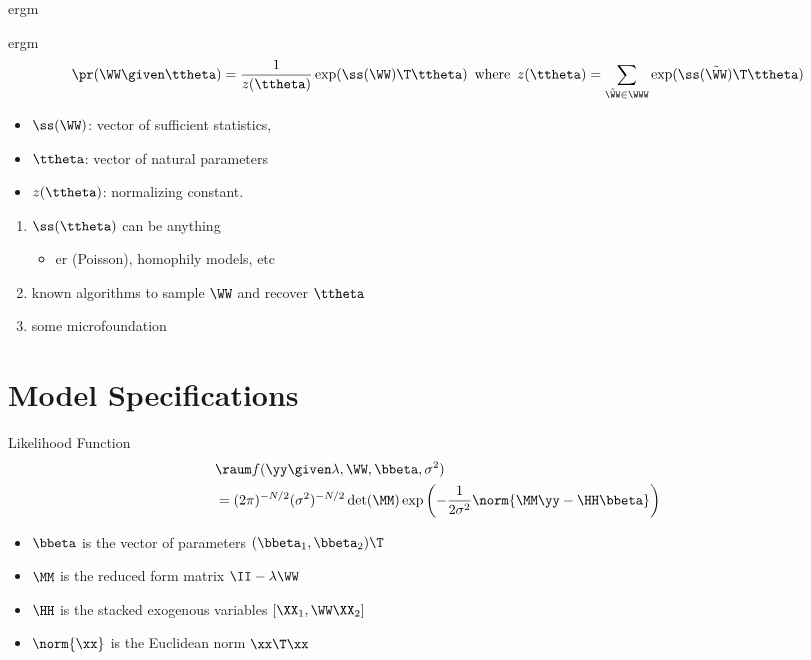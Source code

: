 \documentclass{beamer}
\begin{document}
\begin{frame}{\acrlong{ergm}}
	\begin{block}{\acrshort{ergm}}
		\vspace{-1em}
		\begin{align*}
			\pr(\WW\given\ttheta) = \frac1{z(\ttheta)} \exp(\ss(\WW)\T\ttheta)
			\hspace{0.5em}\text{where}\hspace{0.5em}
			z(\ttheta) = \sum_{\tilde\WW\in\WWW} \exp(\ss(\tilde\WW)\T\ttheta)
		\end{align*}
	\end{block}
	\begin{itemize}
		\item $\ss(\WW)$: vector of sufficient statistics,
		\item $\ttheta$: vector of natural parameters
		\item $z(\ttheta)$: normalizing constant.
	\end{itemize}
	\vspace{1em}
	\begin{enumerate}
		\item {} $\ss(\ttheta)$ can be anything
			\begin{itemize}
				\item \acrlong{er} (Poisson), homophily models, etc
			\end{itemize}
		\item {} known algorithms to sample $\WW$ and recover $\ttheta$
		\item {} some microfoundation
	\end{enumerate}
\end{frame}

\section{Model Specifications}

\begin{frame}{Likelihood Function}
	\begin{align*}
		&\raum f(\yy\given\lambda,\WW,\bbeta,\sigma^2) \\
		&=
		(2\pi)^{-N/2}
		(\sigma^2)^{-N/2}
		\det(\MM)
		\exp \left( -\frac1{2\sigma^2} \norm{\MM\yy - \HH\bbeta} \right)
	\end{align*}
	\begin{itemize}
		\item $\bbeta$ is the vector of parameters $(\bbeta_1,\bbeta_2)\T$
		\item $\MM$ is the reduced form matrix $\II-\lambda\WW$
		\item $\HH$ is the stacked exogenous variables $[\XX_{1},\WW\XX_{2}]$
		\item $\norm{\xx}$ is the Euclidean norm $\xx\T\xx$
	\end{itemize}
\end{frame}
\end{document}

